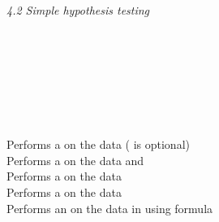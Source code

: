 \textit{4.2 Simple hypothesis testing} \\
\\
\begin{minipage}[t]{.4\textwidth}
\vspace*{-8pt}
 \\
 \\	
 \\
 \\
 \\	
\end{minipage}
\begin{minipage}[t]{.6\textwidth}
Performs a  on the data  ( is optional) \\
Performs a  on the data  and  \\
Performs a  on the data \\
Performs a  on the data \\
Performs an  on the data in  using formula \\
\end{minipage}
\vspace*{.5cm}

